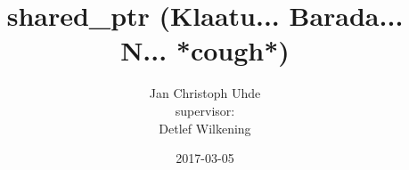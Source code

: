 \documentclass[compress]{beamer}
\title{shared\_ptr (Klaatu... Barada... N... *cough*)}
\author[Jan Christoph Uhde]{Jan Christoph Uhde\\{\vspace{0.5cm} \tiny supervisor:\\Detlef Wilkening}}
\date{2017-03-05}
\begin{document}
\frame{\titlepage}


\end{document}
